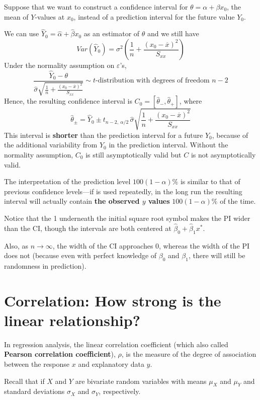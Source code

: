 Suppose that we want to construct a confidence interval for
$\theta = \alpha + \beta x_0$, the mean of $Y$-values at $x_0$, instead of a prediction
interval for the future value $Y_0$.

We can use $\widehat{Y}_0 = \widehat{\alpha} + \widehat{\beta} x_0$ as an estimator of $\theta$ and we still have
\[
    Var(\widehat{Y}_0) = \sigma^2 \left(\frac{1}{n} + \frac{(x_0 - \overline{x})^2}{S_{xx}}\right)
\]
Under the normality assumption on $\varepsilon$'s,
\[
    \frac{\widehat{Y}_0 - \theta}{\widehat{\sigma} \sqrt{\frac{1}{n} + \frac{(x_0 - \overline{x})^2}{S_{xx}}}} \sim t\text{-distribution with degrees of freedom } n-2
\]
Hence, the resulting confidence interval is $C_0 = [\widehat{\theta}_-, \widehat{\theta}_+]$, where
\[
    \widehat{\theta}_\pm = \widehat{Y}_0 \pm t_{n-2, \> \alpha/2}\, \widehat{\sigma} \sqrt{\frac{1}{n} + \frac{(x_0 - \overline{x})^2}{S_{xx}}}
\]
This interval is \textbf{shorter} than the prediction interval for a future $Y_0$,
because of the additional variability from $Y_0$ in the prediction interval.
Without the normality assumption, $C_0$ is still asymptotically valid but $C$
is not asymptotically valid.

The interpretation of the prediction level $100(1-\alpha)\%$ is
similar to that of previous confidence levels---if is used
repeatedly, in the long run the resulting interval will actually
contain \textbf{the observed $y$ values} $100(1-\alpha)\%$ of the time.

Notice that the 1 underneath the initial square root symbol
makes the PI wider than the CI, though the intervals are
both centered at $\widehat{\beta}_0 + \widehat{\beta}_1 x^*$.

Also, as $n \to \infty$, the width of the CI approaches 0, whereas
the width of the PI does not (because even with perfect
knowledge of $\beta_0$ and $\beta_1$, there will still be randomness in
prediction).

\section{Correlation: How strong is the linear relationship?}

In regression analysis, the linear correlation coefficient (which also called \textbf{Pearson correlation coefficient}), $\rho$, 
is the measure of the degree of association between the response $x$ and explanatory data $y$.

Recall that if $X$ and $Y$ are bivariate random variables with means
$\mu_X$ and $\mu_Y$ and standard deviations $\sigma_X$ and $\sigma_Y$, respectively.

